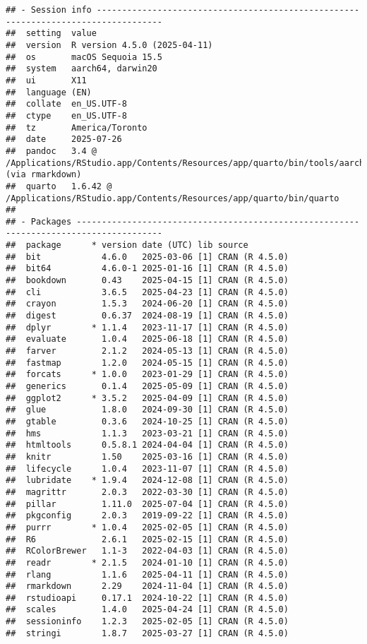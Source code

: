\documentclass[
]{book}
\begin{document}
\begin{verbatim}
## - Session info -----------------------------------------------------------------------------------
##  setting  value
##  version  R version 4.5.0 (2025-04-11)
##  os       macOS Sequoia 15.5
##  system   aarch64, darwin20
##  ui       X11
##  language (EN)
##  collate  en_US.UTF-8
##  ctype    en_US.UTF-8
##  tz       America/Toronto
##  date     2025-07-26
##  pandoc   3.4 @ /Applications/RStudio.app/Contents/Resources/app/quarto/bin/tools/aarch64/ (via rmarkdown)
##  quarto   1.6.42 @ /Applications/RStudio.app/Contents/Resources/app/quarto/bin/quarto
## 
## - Packages ---------------------------------------------------------------------------------------
##  package      * version date (UTC) lib source
##  bit            4.6.0   2025-03-06 [1] CRAN (R 4.5.0)
##  bit64          4.6.0-1 2025-01-16 [1] CRAN (R 4.5.0)
##  bookdown       0.43    2025-04-15 [1] CRAN (R 4.5.0)
##  cli            3.6.5   2025-04-23 [1] CRAN (R 4.5.0)
##  crayon         1.5.3   2024-06-20 [1] CRAN (R 4.5.0)
##  digest         0.6.37  2024-08-19 [1] CRAN (R 4.5.0)
##  dplyr        * 1.1.4   2023-11-17 [1] CRAN (R 4.5.0)
##  evaluate       1.0.4   2025-06-18 [1] CRAN (R 4.5.0)
##  farver         2.1.2   2024-05-13 [1] CRAN (R 4.5.0)
##  fastmap        1.2.0   2024-05-15 [1] CRAN (R 4.5.0)
##  forcats      * 1.0.0   2023-01-29 [1] CRAN (R 4.5.0)
##  generics       0.1.4   2025-05-09 [1] CRAN (R 4.5.0)
##  ggplot2      * 3.5.2   2025-04-09 [1] CRAN (R 4.5.0)
##  glue           1.8.0   2024-09-30 [1] CRAN (R 4.5.0)
##  gtable         0.3.6   2024-10-25 [1] CRAN (R 4.5.0)
##  hms            1.1.3   2023-03-21 [1] CRAN (R 4.5.0)
##  htmltools      0.5.8.1 2024-04-04 [1] CRAN (R 4.5.0)
##  knitr          1.50    2025-03-16 [1] CRAN (R 4.5.0)
##  lifecycle      1.0.4   2023-11-07 [1] CRAN (R 4.5.0)
##  lubridate    * 1.9.4   2024-12-08 [1] CRAN (R 4.5.0)
##  magrittr       2.0.3   2022-03-30 [1] CRAN (R 4.5.0)
##  pillar         1.11.0  2025-07-04 [1] CRAN (R 4.5.0)
##  pkgconfig      2.0.3   2019-09-22 [1] CRAN (R 4.5.0)
##  purrr        * 1.0.4   2025-02-05 [1] CRAN (R 4.5.0)
##  R6             2.6.1   2025-02-15 [1] CRAN (R 4.5.0)
##  RColorBrewer   1.1-3   2022-04-03 [1] CRAN (R 4.5.0)
##  readr        * 2.1.5   2024-01-10 [1] CRAN (R 4.5.0)
##  rlang          1.1.6   2025-04-11 [1] CRAN (R 4.5.0)
##  rmarkdown      2.29    2024-11-04 [1] CRAN (R 4.5.0)
##  rstudioapi     0.17.1  2024-10-22 [1] CRAN (R 4.5.0)
##  scales         1.4.0   2025-04-24 [1] CRAN (R 4.5.0)
##  sessioninfo    1.2.3   2025-02-05 [1] CRAN (R 4.5.0)
##  stringi        1.8.7   2025-03-27 [1] CRAN (R 4.5.0)

\end{verbatim}
\end{document}

